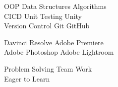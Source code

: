 \documentclass[]{deedy-resume-openfont}
\begin{document}
\begin{minipage}[t]{0.33\textwidth}
\sectionsep

OOP \textbullet{} Data Structures \textbullet{} Algorithms \\ CI\/CD \textbullet{} Unit Testing \textbullet{}
 Unity 
 \\ Version Control \textbullet{} Git \textbullet{} GitHub
 
 \sectionsep
 
Davinci Resolve \textbullet{} Adobe Premiere
\\ Adobe Photoshop \textbullet{} Adobe Lightroom

\sectionsep

Problem Solving  \textbullet{} Team Work \\
Eager to Learn \\
\sectionsep

%
%

\end{minipage} 
\hfill
\end{document}
